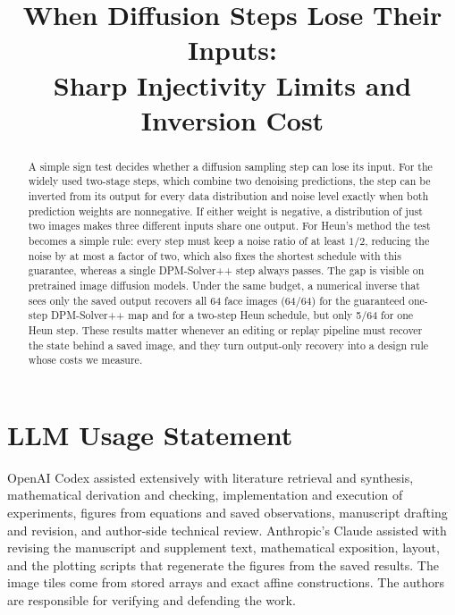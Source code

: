 \documentclass[10pt,twocolumn,letterpaper]{article}
\title{When Diffusion Steps Lose Their Inputs:\\Sharp Injectivity Limits and Inversion Cost}
\author{}
\begin{document}
\maketitle
\begin{abstract}
A simple sign test decides whether a diffusion sampling step can lose its input. For the widely used two-stage steps, which combine two denoising predictions, the step can be inverted from its output for every data distribution and noise level exactly when both prediction weights are nonnegative. If either weight is negative, a distribution of just two images makes three different inputs share one output. For Heun's method the test becomes a simple rule: every step must keep a noise ratio of at least $1/2$, reducing the noise by at most a factor of two, which also fixes the shortest schedule with this guarantee, whereas a single DPM-Solver++ step always passes. The gap is visible on pretrained image diffusion models. Under the same budget, a numerical inverse that sees only the saved output recovers all 64 face images (64/64) for the guaranteed one-step DPM-Solver++ map and for a two-step Heun schedule, but only 5/64 for one Heun step. These results matter whenever an editing or replay pipeline must recover the state behind a saved image, and they turn output-only recovery into a design rule whose costs we measure.
\end{abstract}







\label{mainend}

\section*{LLM Usage Statement}
OpenAI Codex assisted extensively with literature retrieval and synthesis, mathematical derivation and checking, implementation and execution of experiments, figures from equations and saved observations, manuscript drafting and revision, and author-side technical review. Anthropic's Claude assisted with revising the manuscript and supplement text, mathematical exposition, layout, and the plotting scripts that regenerate the figures from the saved results.
The image tiles come from stored arrays and exact affine constructions.
The authors are responsible for verifying and defending the work.
{\small}
\end{document}
